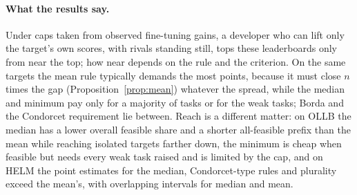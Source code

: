 \documentclass{article}
\begin{document}
\paragraph{What the results say.}
Under caps taken from observed fine-tuning gains, a developer who can lift only the target's own scores, with rivals standing still, tops these leaderboards only from near the top; how near depends on the rule and the criterion. On the same targets the mean rule typically demands the most points, because it must close $n$ times the gap (Proposition~\ref{prop:mean}) whatever the spread, while the median and minimum pay only for a majority of tasks or for the weak tasks; Borda and the Condorcet requirement lie between. Reach is a different matter: on OLLB the median has a lower overall feasible share and a shorter all-feasible prefix than the mean while reaching isolated targets farther down, the minimum is cheap when feasible but needs every weak task raised and is limited by the cap, and on HELM the point estimates for the median, Condorcet-type rules and plurality exceed the mean's, with overlapping intervals for median and mean.
\end{document}
